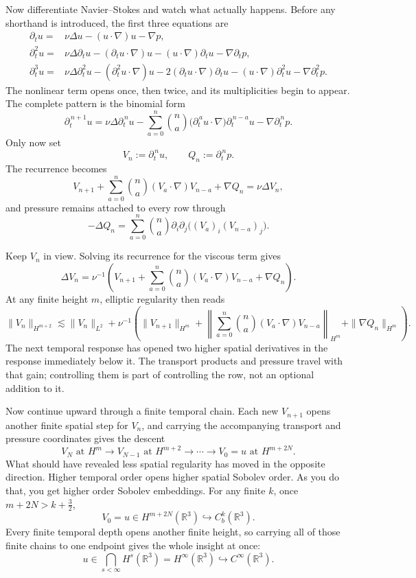 Now differentiate Navier--Stokes and watch what actually happens. Before any
shorthand is introduced, the first three equations are
\[
\begin{aligned}
\partial_tu
={}&\nu\Delta u
 -(u\!\cdot\nabla)u
 -\nabla p,\\[3pt]
\partial_t^2u
={}&\nu\Delta\partial_tu
 -(\partial_tu\!\cdot\nabla)u
 -(u\!\cdot\nabla)\partial_tu
 -\nabla\partial_tp,\\[3pt]
\partial_t^3u
={}&\nu\Delta\partial_t^2u
 -(\partial_t^2u\!\cdot\nabla)u
 -2(\partial_tu\!\cdot\nabla)\partial_tu
 -(u\!\cdot\nabla)\partial_t^2u
 -\nabla\partial_t^2p.
\end{aligned}
\]
The nonlinear term opens once, then twice, and its multiplicities begin to
appear. The complete pattern is the binomial form
\[
\partial_t^{\,n+1}u
=\nu\Delta\partial_t^{\,n}u
-\sum_{a=0}^{n}\binom na
  \bigl(\partial_t^{\,a}u\!\cdot\nabla\bigr)
  \partial_t^{\,n-a}u
-\nabla\partial_t^{\,n}p.
\]
Only now set
\[
V_n:=\partial_t^{\,n}u,
\qquad
Q_n:=\partial_t^{\,n}p.
\]
The recurrence becomes
\[
V_{n+1}
+\sum_{a=0}^{n}\binom na
  (V_a\!\cdot\nabla)V_{n-a}
+\nabla Q_n
=\nu\Delta V_n,
\]
and pressure remains attached to every row through
\[
-\Delta Q_n
=\sum_{a=0}^{n}\binom na
  \partial_i\partial_j
  \bigl((V_a)_i(V_{n-a})_j\bigr).
\]

Keep \(V_n\) in view. Solving its recurrence for the viscous term gives
\[
\Delta V_n
=\nu^{-1}\left(
V_{n+1}
+\sum_{a=0}^{n}\binom na
  (V_a\!\cdot\nabla)V_{n-a}
+\nabla Q_n
\right).
\]
At any finite height \(m\), elliptic regularity then reads
\[
\|V_n\|_{H^{m+2}}
\lesssim
\|V_n\|_{L^2}
+\nu^{-1}\left(
\|V_{n+1}\|_{H^m}
+\left\|
\sum_{a=0}^{n}\binom na(V_a\!\cdot\nabla)V_{n-a}
\right\|_{H^m}
+\|\nabla Q_n\|_{H^m}
\right).
\]
The next temporal response has opened two higher spatial derivatives in the
response immediately below it. The transport products and pressure travel with
that gain; controlling them is part of controlling the row, not an optional
addition to it.

Now continue upward through a finite temporal chain. Each new \(V_{n+1}\)
opens another finite spatial step for \(V_n\), and carrying the accompanying
transport and pressure coordinates gives the descent
\[
V_N\text{ at }H^m
\longrightarrow
V_{N-1}\text{ at }H^{m+2}
\longrightarrow\cdots\longrightarrow
V_0=u\text{ at }H^{m+2N}.
\]
What should have revealed less spatial regularity has moved in the opposite
direction. Higher temporal order opens higher spatial Sobolev order. As you do
that, you get higher order Sobolev embeddings. For any finite \(k\), once
\(m+2N>k+\tfrac32\),
\[
V_0=u\in H^{m+2N}(\mathbb R^3)
\hookrightarrow C_b^k(\mathbb R^3).
\]
Every finite temporal depth opens another finite height, so carrying all of
those finite chains to one endpoint gives the whole insight at once:
\[
u\in\bigcap_{s<\infty}H^s(\mathbb R^3)
=H^\infty(\mathbb R^3)
\hookrightarrow C^\infty(\mathbb R^3).
\]

